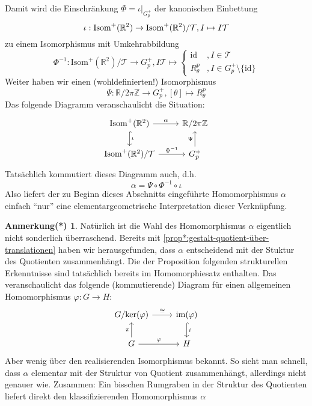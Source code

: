 \documentclass[a4paper, ngerman]{article}
\newcounter{chapter}
\numberwithin{equation}{chapter}
\theoremstyle{plain}
\theoremstyle{definition}
\newtheorem{annotationstrd}{Anmerkung(*)}[chapter]
\newcommand{\id}{\ensuremath{\text{id}}}
\newcommand{\geradisometr}{\ensuremath{\mathrm{Isom}^+(\mathbb R^2)}}
\newcommand{\anm}[1]{{\color{red} #1}}
\begin{document}
Damit wird die Einschränkung \(\Phi = \iota|_{G_p^+}\) der kanonischen Einbettung
\begin{equation*}
    \iota: \geradisometr \break \to \geradisometr/\mathcal T, I \mapsto I\mathcal T
\end{equation*}
zu einem Isomorphismus mit Umkehrabbildung 
\begin{equation*}
    \Phi^{-1}: \geradisometr/\mathcal T \to G_p^+, I\mathcal T \mapsto 
    \begin{cases}
        \id &, I \in \mathcal T \\
        R_\theta^p &, I \in G_p^+\setminus \{\id\}
    \end{cases}
\end{equation*}
Weiter haben wir einen (wohldefinierten!) Isomorphismus 
\begin{equation*}
    \Psi: \mathbb R/2\pi\mathbb Z \to G_p^+, [\theta] \mapsto R_\theta^p
\end{equation*}
Das folgende Diagramm veranschaulicht die Situation:
\begin{equation*}
    \begin{tikzcd}
        \geradisometr \arrow[hook]{d}{\iota} \arrow{r}{\alpha} & \mathbb R/2\pi\mathbb Z \\
        \geradisometr/\mathcal T \arrow{r}{\Phi^{-1}} & G_p^+ \arrow{u}{\Psi}
    \end{tikzcd}
\end{equation*}
Tatsächlich kommutiert dieses Diagramm auch, d.h. 
\begin{equation*}
    \alpha = \Psi\circ \Phi^{-1}\circ \iota
\end{equation*}
Also liefert der zu Beginn dieses Abschnitts eingeführte Homomorphismus \(\alpha\) einfach "`nur"' eine elementargeometrische Interpretation dieser Verknüpfung. 

\begin{annotationstrd}
    Natürlich ist die Wahl des Homomorphismus \(\alpha\) eigentlich nicht sonderlich überraschend. Bereits mit \cref{prop*:gestalt-quotient-über-translationen} haben wir herausgefunden, dass \(\alpha\) entscheidend mit der Stuktur des Quotienten zusammenhängt. Die der Proposition folgenden strukturellen Erkenntnisse sind tatsächlich bereits im Homomorphiesatz enthalten. Das veranschaulicht das folgende (kommutierende) Diagram für einen allgemeinen Homomorphismus \(\varphi: G \to H\): 
    \begin{equation*}
        \begin{tikzcd} 
            G/\mathrm{ker}(\varphi) \arrow{r}{\cong} & \mathrm{im}(\varphi) \arrow[hookrightarrow]{d}{i} \\ G \arrow{u}{\pi} \arrow{r}{\varphi} & H
        \end{tikzcd}
    \end{equation*}
    \anm{Aber wenig über den realisierenden Isomorphismus bekannt. So sieht man schnell, dass \(\alpha\) elementar mit der Struktur von Quotient zusammenhängt, allerdings nicht genauer wie.}
    \anm{Zusammen: Ein bisschen Rumgraben in der Struktur des Quotienten liefert direkt den klassifizierenden Homomorphismus \(\alpha\)}
\end{annotationstrd}
\end{document}
